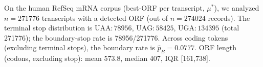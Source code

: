 On the human RefSeq mRNA corpus (best-ORF per transcript, $\mu^\ast$), we analyzed $n=271776$ transcripts with a detected ORF (out of $n=274024$ records). The terminal stop distribution is $\mathrm{UAA}:78956$, $\mathrm{UAG}:58425$, $\mathrm{UGA}:134395$ (total 271776); the boundary-stop rate is 78956/271776. Across coding tokens (excluding terminal stops), the boundary rate is $\widehat{p}_B=0.0777$. ORF length (codons, excluding stop): mean 573.8, median 407, IQR [161,738].
